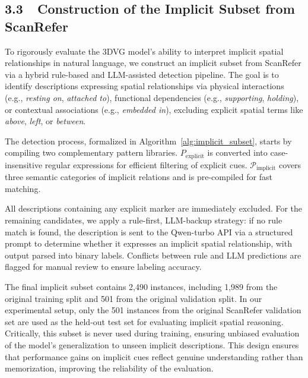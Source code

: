 \documentclass[letterpaper]{article} %
\begin{document}
\subsection{3.3~~Construction of the Implicit Subset from ScanRefer}

To rigorously evaluate the 3DVG model's ability to interpret implicit spatial relationships in natural language, we construct an implicit subset from ScanRefer via a hybrid rule-based and LLM-assisted detection pipeline. The goal is to identify descriptions expressing spatial relationships via physical interactions (e.g., \textit{resting on}, \textit{attached to}), functional dependencies (e.g., \textit{supporting}, \textit{holding}), or contextual associations (e.g., \textit{embedded in}), excluding explicit spatial terms like \textit{above}, \textit{left}, or \textit{between}. 

The detection process, formalized in Algorithm~\ref{alg:implicit_subset}, starts by compiling two complementary pattern libraries. $P_{\text{explicit}}$ is converted into case-insensitive regular expressions for efficient filtering of explicit cues. $\mathcal{P}_{\text{implicit}}$ covers three semantic categories of implicit relations and is pre-compiled for fast matching.

All descriptions containing any explicit marker are immediately excluded. For the remaining candidates, we apply a rule-first, LLM-backup strategy: if no rule match is found, the description is sent to the Qwen-turbo\cite{ahmed2025qwen} API via a structured prompt to determine whether it expresses an implicit spatial relationship, with output parsed into binary labels. Conflicts between rule and LLM predictions are flagged for manual review to ensure labeling accuracy.

The final implicit subset contains 2,490 instances, including 1,989 from the original training split and 501 from the original validation split. In our experimental setup, only the 501 instances from the original ScanRefer validation set are used as the held-out test set for evaluating implicit spatial reasoning. Critically, this subset is never used during training, ensuring unbiased evaluation of the model’s generalization to unseen implicit descriptions. This design ensures that performance gains on implicit cues reflect genuine understanding rather than memorization, improving the reliability of the evaluation.
\end{document}
